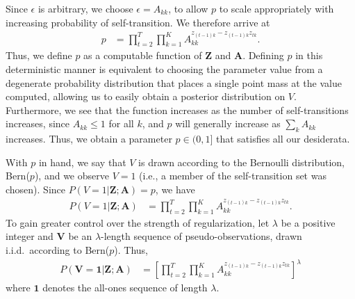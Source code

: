 Since $\epsilon$ is arbitrary, we choose $\epsilon = A_{kk}$, to allow $p$ to scale appropriately with increasing probability of self-transition. We therefore arrive at
\begin{align*}
    p &= \prod^{T}_{t=2}\prod^{K}_{k=1}A_{kk}^{z_{(t-1)k} - z_{(t-1)k}z_{tk}}.
\end{align*}
Thus, we define $p$ as a computable function of $\mathbf{Z}$ and $\mathbf{A}$. Defining $p$ in this deterministic manner is equivalent to choosing the parameter value from a degenerate probability distribution that places a single point mass at the value computed, allowing us to easily obtain a posterior distribution on $V$. Furthermore, we see that the function increases as the number of self-transitions increases, since $A_{kk} \leq 1$ for all $k$, and $p$ will generally increase as $\sum_k A_{kk}$ increases. Thus, we obtain a parameter $p \in (0,1]$ that satisfies all our desiderata.

With $p$ in hand, we say that $V$ is drawn according to the Bernoulli distribution, Bern($p$), and we observe $V = 1$ (i.e., a member of the self-transition set was chosen). Since $P(V = 1|\mathbf{Z};\mathbf{A}) = p$, we have
\begin{align*}
    P(V = 1|\mathbf{Z}; \mathbf{A}) &= \prod^{T}_{t=2}\prod^{K}_{k=1}A_{kk}^{z_{(t-1)k} - z_{(t-1)k}z_{tk}}.
\end{align*}
To gain greater control over the strength of regularization, let $\lambda$ be a positive integer and $\mathbf{V}$ be an $\lambda$-length sequence of pseudo-observations, drawn i.i.d.\ according to Bern($p$). Thus, 
\begin{align*}
    P(\mathbf{V} = \mathbf{1}|\mathbf{Z}; \mathbf{A}) &= \left[\prod^{T}_{t=2}\prod^{K}_{k=1}A_{kk}^{z_{(t-1)k} - z_{(t-1)k}z_{tk}}\right]^\lambda
\end{align*}
where $\mathbf{1}$ denotes the all-ones sequence of length $\lambda$.


